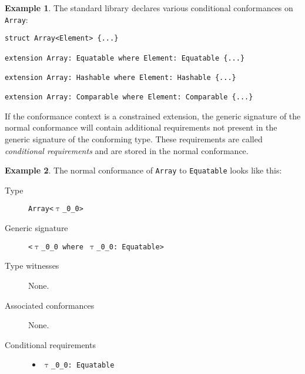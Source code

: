 \documentclass[a4paper,headsepline,bibliography=totoc,toc=flat,fleqn,twoside=semi]{scrbook}
\theoremstyle{definition}
\theoremstyle{definition}
\newtheorem{example}{Example}[chapter]
\theoremstyle{definition}
\newcommand{\ttgp}[2]{\texttt{$\uptau$\_#1\_#2}}
\begin{document}
\begin{example} The standard library declares various conditional conformances on \texttt{Array}:
\begin{Verbatim}
struct Array<Element> {...}

extension Array: Equatable where Element: Equatable {...}

extension Array: Hashable where Element: Hashable {...}

extension Array: Comparable where Element: Comparable {...}
\end{Verbatim}
\end{example}

If the conformance context is a constrained extension, the generic signature of the normal conformance will contain additional requirements not present in the generic signature of the conforming type. These requirements are called \emph{conditional requirements} and are stored in the normal conformance.

\begin{example}
The normal conformance of \texttt{Array} to \texttt{Equatable} looks like this:
\begin{description}
\item[Type] \texttt{Array<\ttgp{0}{0}>}
\item[Generic signature] \texttt{<\ttgp{0}{0} where \ttgp{0}{0}:\ Equatable>}

\item[Type witnesses] None.

\item[Associated conformances] None.

\item[Conditional requirements] \phantom{a}

\begin{itemize}
\item \texttt{\ttgp{0}{0}:\ Equatable}
\end{itemize}
\end{description}
\end{example}
\end{document}
